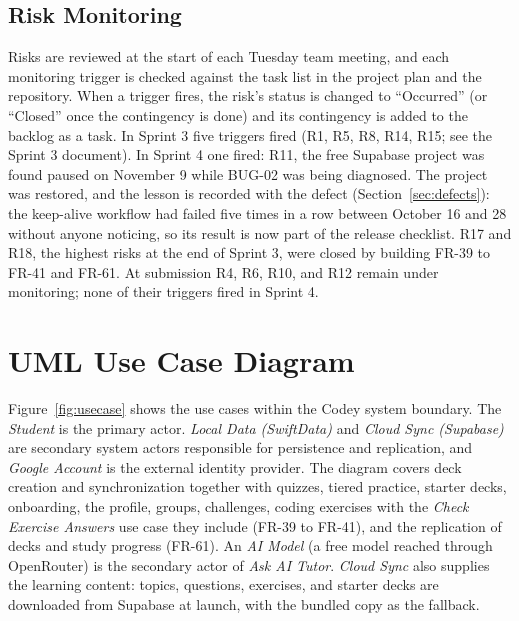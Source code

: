 \documentclass[12pt,letterpaper]{article}
\begin{document}
\subsection{Risk Monitoring}
Risks are reviewed at the start of each Tuesday team meeting, and each monitoring
trigger is checked against the task list in the project plan and the repository. When a trigger fires, the risk's
status is changed to ``Occurred'' (or ``Closed'' once the contingency is done) and
its contingency is added to the backlog as a task. In Sprint 3 five triggers fired (R1, R5, R8, R14, R15; see the Sprint 3
document). In Sprint 4 one fired: R11, the free Supabase project was found paused on
November 9 while BUG-02 was being diagnosed. The project was restored, and the lesson
is recorded with the defect (Section~\ref{sec:defects}): the keep-alive workflow had
failed five times in a row between October 16 and 28 without anyone noticing, so its
result is now part of the release checklist. R17 and R18, the highest risks at the end of
Sprint 3, were closed by building FR-39 to FR-41 and FR-61. At submission R4, R6, R10,
and R12 remain under monitoring; none of their triggers fired in Sprint 4.

\section{UML Use Case Diagram}\label{sec:usecase}
Figure~\ref{fig:usecase} shows the use cases within the Codey system boundary. The
\emph{Student} is the primary actor. \emph{Local Data (SwiftData)} and \emph{Cloud
Sync (Supabase)} are secondary system actors responsible for persistence and
replication, and \emph{Google Account} is the external identity provider. The
diagram covers deck creation and synchronization together with quizzes, tiered
practice, starter decks, onboarding, the profile, groups, challenges, coding
exercises with the \emph{Check Exercise Answers} use case they include (FR-39 to
FR-41), and the replication of decks and study progress (FR-61). An \emph{AI Model}
(a free model reached through OpenRouter) is the secondary actor of \emph{Ask AI
Tutor}. \emph{Cloud Sync} also supplies the learning content: topics, questions,
exercises, and starter decks are downloaded from Supabase at launch, with the
bundled copy as the fallback.
\end{document}
